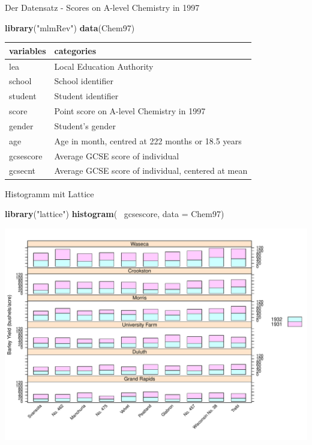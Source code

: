 \documentclass[ignorenonframetext,]{beamer}
\newenvironment{Shaded}{}{}
\newcommand{\KeywordTok}[1]{\textcolor[rgb]{0.00,0.44,0.13}{\textbf{{#1}}}}
\newcommand{\DataTypeTok}[1]{\textcolor[rgb]{0.56,0.13,0.00}{{#1}}}
\newcommand{\StringTok}[1]{\textcolor[rgb]{0.25,0.44,0.63}{{#1}}}
\newcommand{\NormalTok}[1]{{#1}}
\begin{document}
\begin{frame}[fragile]{Der Datensatz - Scores on A-level Chemistry in
1997}

\begin{Shaded}
\begin{Highlighting}[]
\KeywordTok{library}\NormalTok{(}\StringTok{"mlmRev"}\NormalTok{)}
\KeywordTok{data}\NormalTok{(Chem97)}
\end{Highlighting}
\end{Shaded}

\begin{longtable}[]{@{}ll@{}}
\toprule
variables & categories\tabularnewline
\midrule
\endhead
lea & Local Education Authority\tabularnewline
school & School identifier\tabularnewline
student & Student identifier\tabularnewline
score & Point score on A-level Chemistry in 1997\tabularnewline
gender & Student's gender\tabularnewline
age & Age in month, centred at 222 months or 18.5 years\tabularnewline
gcsescore & Average GCSE score of individual\tabularnewline
gcsecnt & Average GCSE score of individual, centered at
mean\tabularnewline
\bottomrule
\end{longtable}

\end{frame}

\begin{frame}[fragile]{Histogramm mit Lattice}

\begin{Shaded}
\begin{Highlighting}[]
\KeywordTok{library}\NormalTok{(}\StringTok{"lattice"}\NormalTok{)}
\KeywordTok{histogram}\NormalTok{(~}\StringTok{ }\NormalTok{gcsescore, }\DataTypeTok{data =} \NormalTok{Chem97)}
\end{Highlighting}
\end{Shaded}

\includegraphics{R_intern_files/figure-beamer/unnamed-chunk-225-1.pdf}

\end{frame}
\end{document}
